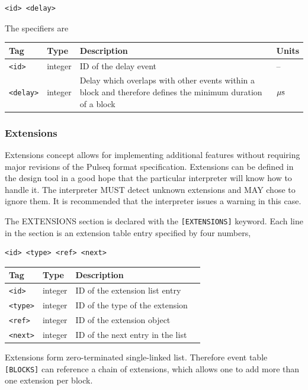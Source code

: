 \documentclass{article}
\begin{document}
\begin{lstlisting}
<id> <delay>
\end{lstlisting}

The specifiers are

\begin{tabularx}{\textwidth}{llXl}
\toprule
Tag & Type & Description & Units\\
\midrule
\verb.<id>. & integer & ID of the delay event & -- \\
\verb.<delay>. & integer & Delay which overlaps with other events within a block and therefore defines the minimum duration of a block & $\rm \mu s$ \\
\bottomrule
\end{tabularx}

\subsubsection{Extensions}
Extensions concept allows for implementing additional features without requiring major revisions of the Pulseq format specification. Extensions can be defined in the design tool in a good hope that the particular interpreter will know how to handle it. The interpreter MUST detect unknown extensions and MAY chose to ignore them. It is recommended that the interpreter issues a warning in this case. 

The EXTENSIONS section is declared with the \verb.[EXTENSIONS]. keyword. Each line in the section is an extension table entry specified by four numbers,
\begin{lstlisting}
<id> <type> <ref> <next>
\end{lstlisting}

\begin{tabularx}{\textwidth}{llXl}
\toprule
Tag & Type & Description \\
\midrule
\verb.<id>. & integer & ID of the extension list entry \\
\verb.<type>. & integer & ID of the type of the extension \\
\verb.<ref>. & integer & ID of the extension object \\
\verb.<next>. & integer & ID of the next entry in the list \\
\bottomrule
\end{tabularx}

Extensions form zero-terminated single-linked list. Therefore event table \verb.[BLOCKS]. can reference a chain of extensions, which allows one to add more than one extension per block. \\
\end{document}
